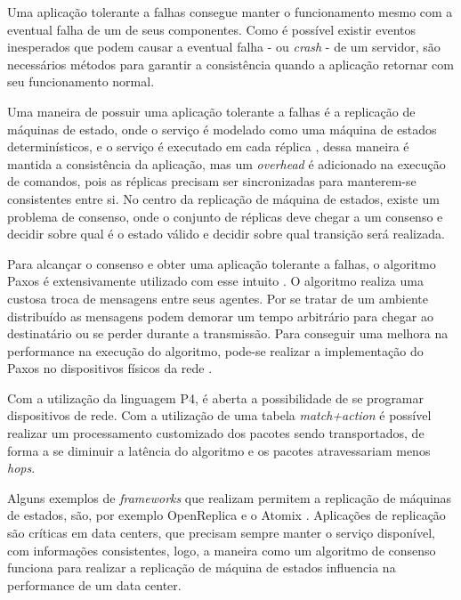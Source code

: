 \documentclass[
    12pt,
    openright, 
    oneside,
    a4paper,
    french,
    english,
    brazil
    ]{facom-ufu-abntex2}
\theoremstyle{definition}
\begin{document}
Uma aplicação tolerante a falhas consegue manter o funcionamento mesmo com a eventual 
falha de um de seus componentes. 
Como é possível existir eventos inesperados que podem causar a eventual falha - ou \emph{crash} - de um servidor, são necessários métodos para garantir a consistência quando a aplicação retornar com seu funcionamento normal. 

Uma maneira de possuir uma aplicação tolerante a falhas é a replicação de máquinas de estado, onde o serviço é modelado como uma máquina de estados determinísticos, e o serviço é executado em cada réplica \cite{santos2012state}, dessa maneira é mantida a consistência da aplicação, mas um \emph{overhead} é adicionado na execução de comandos, pois as réplicas precisam ser sincronizadas para manterem-se consistentes entre si. 
No centro da replicação de máquina de estados, existe um problema de consenso, onde o conjunto de réplicas deve chegar a um consenso e decidir sobre qual é o estado válido e decidir sobre qual 
transição será realizada. 

Para alcançar o consenso e obter uma aplicação tolerante a falhas, o algoritmo
Paxos é extensivamente utilizado com esse intuito \cite{dang2016paxos}. 
O algoritmo realiza uma custosa troca de mensagens entre seus agentes. Por se 
tratar de um ambiente distribuído as mensagens podem demorar um tempo arbitrário 
para chegar ao destinatário ou se perder durante a transmissão. Para conseguir 
uma melhora na performance na execução do algoritmo, pode-se realizar a 
implementação do Paxos no dispositivos físicos da rede \cite{dang2016paxos}.

Com a utilização da linguagem P4, é aberta a possibilidade de se programar dispositivos de rede. 
Com a utilização de uma tabela \emph{match+action} é possível realizar um processamento customizado dos pacotes sendo transportados, de forma a se diminuir a latência do algoritmo e os pacotes atravessariam menos \emph{hops}.

Alguns exemplos de \emph{frameworks} que realizam permitem a replicação de máquinas de estados, são, por exemplo OpenReplica \cite{openreplica} e o Atomix \cite{atomixio}. 
Aplicações de replicação são críticas em data centers, que precisam sempre manter o serviço  disponível, com informações consistentes, logo, a maneira como um algoritmo de consenso funciona para realizar a replicação de máquina de estados influencia na performance de um data center.
\end{document}
